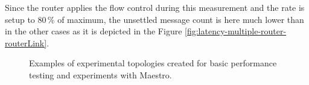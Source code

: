Since the router applies the flow control during this measurement and the rate is setup to 80\,\% of maximum, the unsettled message count is here much lower than in the other cases as it is depicted in the Figure \ref{fig:latency-multiple-router-routerLink}.

\begin{figure}[H]
	\centering
	\begin{minipage}{0.49\linewidth}
	\end{minipage}
	\begin{minipage}{0.49\linewidth}
	\end{minipage}
	\caption[Examples of experimental topologies created for basic performance testing and experiments with Maestro.]{Examples of experimental topologies created for basic performance testing and experiments with Maestro.}\label{fig:routerLink-latency}
\end{figure}

